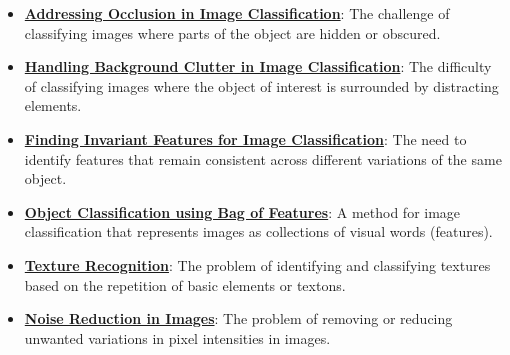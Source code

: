 \documentclass{article}%
\begin{document}
\begin{itemize}[leftmargin=*]
\item \href{https://purdue.brightspace.com/d2l/common/assets/pdfjs-d2l-dist/1.0.14-legacy/web/viewer.html?file=\%2Fcontent\%2Fenforced\%2F1095467-wl.202510.CS.24300.001\%2F07L2-Vision.pdf\%3Fou\%3D1095467\&lang=en-us\&container=d2l-fileviewer-rendered-pdf\&fullscreen=d2l-fileviewer-rendered-pdf-dialog\&height=667#page=9}{\textbf{Addressing Occlusion in Image Classification}}: The challenge of classifying images where parts of the object are hidden or obscured.%
\item \href{https://purdue.brightspace.com/d2l/common/assets/pdfjs-d2l-dist/1.0.14-legacy/web/viewer.html?file=\%2Fcontent\%2Fenforced\%2F1095467-wl.202510.CS.24300.001\%2F07L2-Vision.pdf\%3Fou\%3D1095467\&lang=en-us\&container=d2l-fileviewer-rendered-pdf\&fullscreen=d2l-fileviewer-rendered-pdf-dialog\&height=667#page=10}{\textbf{Handling Background Clutter in Image Classification}}: The difficulty of classifying images where the object of interest is surrounded by distracting elements.%
\item \href{https://purdue.brightspace.com/d2l/common/assets/pdfjs-d2l-dist/1.0.14-legacy/web/viewer.html?file=\%2Fcontent\%2Fenforced\%2F1095467-wl.202510.CS.24300.001\%2F07L2-Vision.pdf\%3Fou\%3D1095467\&lang=en-us\&container=d2l-fileviewer-rendered-pdf\&fullscreen=d2l-fileviewer-rendered-pdf-dialog\&height=667#page=11}{\textbf{Finding Invariant Features for Image Classification}}: The need to identify features that remain consistent across different variations of the same object.%
\item \href{https://purdue.brightspace.com/d2l/common/assets/pdfjs-d2l-dist/1.0.14-legacy/web/viewer.html?file=\%2Fcontent\%2Fenforced\%2F1095467-wl.202510.CS.24300.001\%2F07L2-Vision.pdf\%3Fou\%3D1095467\&lang=en-us\&container=d2l-fileviewer-rendered-pdf\&fullscreen=d2l-fileviewer-rendered-pdf-dialog\&height=667#page=12}{\textbf{Object Classification using Bag of Features}}: A method for image classification that represents images as collections of visual words (features).%
\item \href{https://purdue.brightspace.com/d2l/common/assets/pdfjs-d2l-dist/1.0.14-legacy/web/viewer.html?file=\%2Fcontent\%2Fenforced\%2F1095467-wl.202510.CS.24300.001\%2F07L2-Vision.pdf\%3Fou\%3D1095467\&lang=en-us\&container=d2l-fileviewer-rendered-pdf\&fullscreen=d2l-fileviewer-rendered-pdf-dialog\&height=667#page=28}{\textbf{Texture Recognition}}: The problem of identifying and classifying textures based on the repetition of basic elements or textons.%
\item \href{https://purdue.brightspace.com/d2l/common/assets/pdfjs-d2l-dist/1.0.14-legacy/web/viewer.html?file=\%2Fcontent\%2Fenforced\%2F1095467-wl.202510.CS.24300.001\%2F07L2-Vision.pdf\%3Fou\%3D1095467\&lang=en-us\&container=d2l-fileviewer-rendered-pdf\&fullscreen=d2l-fileviewer-rendered-pdf-dialog\&height=667#page=35}{\textbf{Noise Reduction in Images}}: The problem of removing or reducing unwanted variations in pixel intensities in images.%

\end{itemize}
\end{document}
